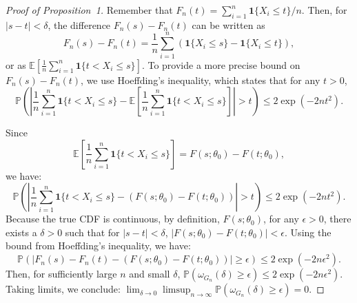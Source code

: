 \documentclass[12pt]{article}
\begin{document}
\begin{proof}[Proof of Proposition~1]
Remember that $F_n(t) = \sum_{i=1}^n  \mathbf{1}\{X_i \le t\} / n$. Then, for 
$ |s - t| < \delta $, the difference $ F_n(s) - F_n(t) $ can be written as
\[
  F_n(s) - F_n(t) = \frac{1}{n}
  \sum_{i=1}^n \left( \mathbf{1}\{X_i \leq s\} - \mathbf{1}\{X_i \leq t\} \right),
\]
or as 
$ \mathbb{E}\left[ \frac{1}{n} \sum_{i=1}^n \mathbf{1}\{ t < X_i \leq s \} 
\right] $. To provide a more precise bound on $ F_n(s) - F_n(t) $, we use 
Hoeffding's inequality, which states that for any $ t > 0 $,
\[
  \mathbb{P}\left( \left| \frac{1}{n} \sum_{i=1}^n \mathbf{1}\{ t < X_i \leq s \} - 
      \mathbb{E}\left[ \frac{1}{n} \sum_{i=1}^n \mathbf{1}\{ t < X_i \leq s \} 
      \right] \right| > t \right) \leq 2 \exp\left( -2nt^2 \right).
\]


Since 
\[ \mathbb{E}\left[ \frac{1}{n} \sum_{i=1}^n \mathbf{1}\{ t < X_i \leq s \} 
\right] = F(s; \theta_0) - F(t; \theta_0),
\]
we have:
\[
  \mathbb{P}\left( \left| \frac{1}{n} \sum_{i=1}^n \mathbf{1}\{ t < X_i \leq s \} - 
      (F(s; \theta_0) - F(t; \theta_0)) \right| > t \right) \leq
  2\exp\left( -2nt^2 \right).
\]
Because the true CDF is continuous, by definition,
$ F(s; \theta_0) $, for any $ \epsilon > 0 $,
there exists a $ \delta > 0 $ such that for $ |s - t| < \delta $,
$ |F(s; \theta_0) - F(t; \theta_0)| < \epsilon. $
Using the bound from Hoeffding's inequality, we have:
\[
  \mathbb{P}\left( |F_n(s) - F_n(t) - (F(s; \theta_0) - F(t; \theta_0))| \geq 
    \epsilon \right) \leq 2 \exp\left( -2n\epsilon^2 \right).
\]
Then, for sufficiently large $ n $ and small $ \delta $,
$ \mathbb{P}\left( \omega_{G_n}(\delta) \geq \epsilon \right) \leq 2 
\exp\left( -2n\epsilon^2 \right). $ Taking limits, we conclude:
$ \lim_{\delta \to 0} \limsup_{n \to \infty} \mathbb{P}\left( 
\omega_{G_n}(\delta) \geq \epsilon \right) = 0. $


\end{proof}
\end{document}
